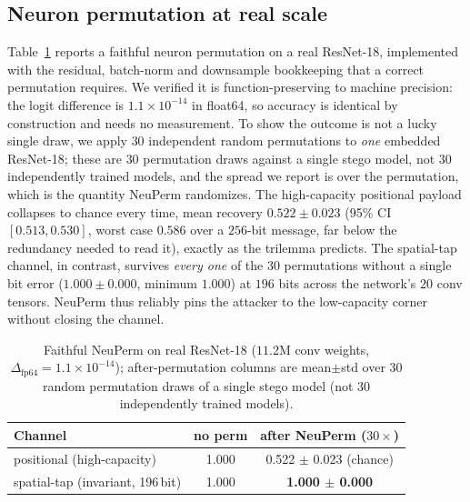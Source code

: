 \documentclass[a4paper,fleqn]{cas-dc}
\theoremstyle{plain}
\theoremstyle{remark}
\begin{document}
\subsection{Neuron permutation at real scale}
Table~\ref{tab:neuperm} reports a faithful neuron permutation on a real ResNet-18,
implemented with the residual, batch-norm and downsample bookkeeping that a correct
permutation requires. We verified it is function-preserving to machine precision: the
logit difference is $1.1\times10^{-14}$ in float64, so accuracy is identical by
construction and needs no measurement. To show the outcome is not a lucky single draw, we
apply $30$ independent random permutations to \emph{one} embedded ResNet-18; these are $30$
permutation draws against a single stego model, not $30$ independently trained models, and the
spread we report is over the permutation, which is the quantity NeuPerm randomizes. The high-capacity
positional payload collapses to chance every time, mean recovery $0.522\pm0.023$ (95\% CI
$[0.513,0.530]$, worst case $0.586$ over a $256$-bit message, far below the redundancy
needed to read it), exactly as the trilemma predicts. The spatial-tap channel, in contrast,
survives \emph{every one} of the $30$ permutations without a single bit error
($1.000\pm0.000$, minimum $1.000$) at $196$ bits across the network's $20$ conv tensors.
NeuPerm thus reliably pins the attacker to the low-capacity corner without closing the
channel.

\begin{table}[!tb]\centering
\caption{Faithful NeuPerm on real ResNet-18 ($11.2$M conv weights,
$\Delta_{\mathrm{fp64}}=1.1\times10^{-14}$); after-permutation columns are
mean$\pm$std over $30$ random permutation draws of a single stego model (not $30$
independently trained models).}
\label{tab:neuperm}
\begin{tabular*}{\columnwidth}{@{\extracolsep{\fill}}lcc@{}}
\toprule
Channel & no perm & after NeuPerm ($30\times$)\\
\midrule
positional (high-capacity) & 1.000 & 0.522 $\pm$ 0.023 (chance)\\
spatial-tap (invariant, 196\,bit) & 1.000 & \textbf{1.000 $\pm$ 0.000}\\
\bottomrule
\end{tabular*}
\end{table}
\end{document}
